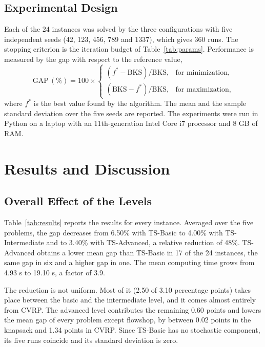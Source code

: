 \documentclass[engproc,proceedingpaper,submit,moreauthors]{Definitions/mdpi}
\begin{document}
\subsection{Experimental Design}

Each of the 24 instances was solved by the three configurations with five independent seeds (42, 123, 456, 789 and 1337), which gives 360 runs. The stopping criterion is the iteration budget of Table~\ref{tab:params}. Performance is measured by the gap with respect to the reference value,
\begin{equation}
\mathrm{GAP}\,(\%) = 100 \times
\begin{cases}
(f^{*} - \mathrm{BKS})/\mathrm{BKS}, & \text{for minimization},\\
(\mathrm{BKS} - f^{*})/\mathrm{BKS}, & \text{for maximization},
\end{cases}
\label{eq:gap}
\end{equation}
where $f^{*}$ is the best value found by the algorithm. The mean and the sample standard deviation over the five seeds are reported. The experiments were run in Python on a laptop with an 11th-generation Intel Core i7 processor and 8 GB of RAM.

\section{Results and Discussion}

\subsection{Overall Effect of the Levels}

Table~\ref{tab:results} reports the results for every instance. Averaged over the five problems, the gap decreases from 6.50\% with TS-Basic to 4.00\% with TS-Intermediate and to 3.40\% with TS-Advanced, a relative reduction of 48\%. TS-Advanced obtains a lower mean gap than TS-Basic in 17 of the 24 instances, the same gap in six and a higher gap in one. The mean computing time grows from 4.93 s to 19.10 s, a factor of 3.9.

The reduction is not uniform. Most of it (2.50 of 3.10 percentage points) takes place between the basic and the intermediate level, and it comes almost entirely from CVRP. The advanced level contributes the remaining 0.60 points and lowers the mean gap of every problem except flowshop, by between 0.02 points in the knapsack and 1.34 points in CVRP. Since TS-Basic has no stochastic component, its five runs coincide and its standard deviation is zero.
\end{document}
